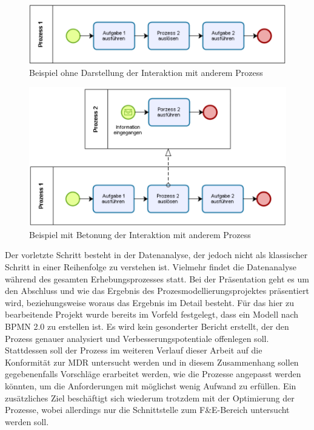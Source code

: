 \documentclass[a4paper,12pt]{report}
\begin{document}
\begin{figure}[ht]
\centering
\noindent\includegraphics[width=\linewidth,height=\textheight,
keepaspectratio]{Images/modellierungstiefe1}
\caption[Beispiel ohne Darstellung der Interaktion mit anderem Prozess]{Beispiel ohne Darstellung der Interaktion mit anderem Prozess}
\label{modellierungstiefe_flach}
\end{figure}
\begin{figure}[ht]
\centering
\noindent\includegraphics[width=\linewidth,height=\textheight,
keepaspectratio]{Images/modellierungstiefe2}
\caption[Beispiel mit Betonung der Interaktion mit anderem Prozess]{Beispiel mit Betonung der Interaktion mit anderem Prozess}
\label{modellierungstiefe_tiefer}
\end{figure}

Der vorletzte Schritt besteht in der Datenanalyse, der jedoch nicht als klassischer Schritt in einer Reihenfolge zu verstehen ist. Vielmehr findet die Datenanalyse während des gesamten Erhebungsprozesses statt. Bei der Präsentation geht es um den Abschluss und wie das Ergebnis des Prozesmodellierungsprojektes präsentiert wird, beziehungsweise woraus das Ergebnis im Detail besteht. Für das hier zu bearbeitende Projekt wurde bereits im Vorfeld festgelegt, dass ein Modell nach BPMN 2.0 zu erstellen ist. Es wird kein gesonderter Bericht erstellt, der den Prozess genauer analysiert und Verbesserungspotentiale offenlegen soll. Stattdessen soll der Prozess im weiteren Verlauf dieser Arbeit auf die Konformität zur MDR untersucht werden und in diesem Zusammenhang sollen gegebenenfalls Vorschläge erarbeitet werden, wie die Prozesse angepasst werden könnten, um die Anforderungen mit möglichst wenig Aufwand zu erfüllen. Ein zusätzliches Ziel beschäftigt sich wiederum trotzdem mit der Optimierung der Prozesse, wobei allerdings nur die Schnittstelle zum F\&E-Bereich untersucht werden soll.
\end{document}
